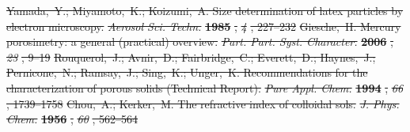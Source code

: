 \documentclass[journal=langd5,manuscript=article]{achemso}
\providecommand{\DIFdel}[1]{{\protect\color{red}\sout{#1}}}                      %
\begin{document}
\DIFdel{Yamada,~Y.; Miyamoto,~K.; Koizumi,~A. Size determination of latex particles by
  electron microscopy. }\emph{\DIFdel{Aerosol Sci. Techn.}} %
\textbf{\DIFdel{1985}}%
\DIFdel{, }\emph{\DIFdel{4}}%
\DIFdel{,
  227--232}%
\DIFdel{Giesche,~H. Mercury porosimetry: a general (practical) overview. }\emph{\DIFdel{Part.
  Part. Syst. Character.}} %
\textbf{\DIFdel{2006}}%
\DIFdel{, }\emph{\DIFdel{23}}%
\DIFdel{, 9--19}%
\DIFdel{Rouquerol,~J.; Avnir,~D.; Fairbridge,~C.; Everett,~D.; Haynes,~J.;
  Pernicone,~N.; Ramsay,~J.; Sing,~K.; Unger,~K. Recommendations for the
  characterization of porous solids (Technical Report). }\emph{\DIFdel{Pure Appl. Chem.}}
\textbf{\DIFdel{1994}}%
\DIFdel{, }\emph{\DIFdel{66}}%
\DIFdel{, 1739--1758}%
\DIFdel{Chou,~A.; Kerker,~M. The refractive index of colloidal sols. }\emph{\DIFdel{J. Phys.
  Chem.}} %
\textbf{\DIFdel{1956}}%
\DIFdel{, }\emph{\DIFdel{60}}%
\DIFdel{, 562--564}%
\end{document}
